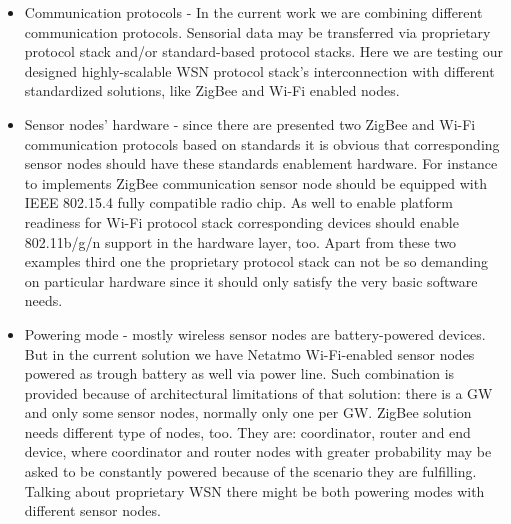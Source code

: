 \documentclass[journal]{IEEEtran}
\begin{document}
\begin {itemize}
\item Communication protocols - In the current work we are combining different communication protocols. Sensorial data may be transferred via proprietary protocol stack and/or standard-based protocol stacks. Here we are testing our designed highly-scalable WSN protocol stack's interconnection with different standardized solutions, like ZigBee and Wi-Fi enabled nodes.
\item Sensor nodes' hardware - since there are presented two ZigBee and Wi-Fi communication protocols based on standards it is obvious that corresponding sensor nodes should have these standards enablement hardware. For instance to implements ZigBee communication sensor node should be equipped with IEEE 802.15.4 fully compatible radio chip. As well to enable platform readiness for Wi-Fi protocol stack corresponding devices should enable 802.11b/g/n support in the hardware layer, too. Apart from these two examples third one the proprietary protocol stack can not be so demanding on particular hardware since it should only satisfy the very basic software needs.
\item Powering mode - mostly wireless sensor nodes are battery-powered devices. But in the current solution we have Netatmo Wi-Fi-enabled sensor nodes powered as trough battery as well via power line. Such combination is provided because of architectural limitations of that solution: there is a GW and only some sensor nodes, normally only one per GW. ZigBee solution needs different type of nodes, too. They are: coordinator, router and end device, where coordinator and router nodes with greater probability may be asked to be constantly powered because of the scenario they are fulfilling. Talking about proprietary WSN there might be both powering modes with different sensor nodes.
\end {itemize}
\end{document}
